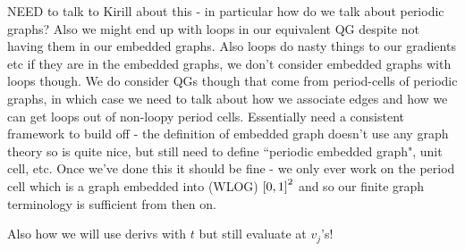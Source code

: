 NEED to talk to Kirill about this - in particular how do we talk about periodic graphs? Also we might end up with loops in our equivalent QG despite not having them in our embedded graphs.
Also loops do nasty things to our gradients etc if they are in the embedded graphs, we don't consider embedded graphs with loops though.
We do consider QGs though that come from period-cells of periodic graphs, in which case we need to talk about how we associate edges and how we can get loops out of non-loopy period cells.
Essentially need a consistent framework to build off - the definition of embedded graph doesn't use any graph theory so is quite nice, but still need to define ``periodic embedded graph", unit cell, etc.
Once we've done this it should be fine - we only ever work on the period cell which is a graph embedded into (WLOG) $\left[ 0,1 \right]^2$ and so our finite graph terminology is sufficient from then on.

Also how we will use derivs with $t$ but still evaluate at $v_j$'s!

